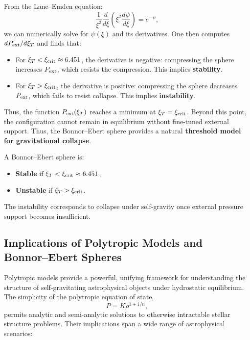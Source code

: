 From the Lane–Emden equation:
\[
\frac{1}{\xi^2} \frac{d}{d\xi}\left( \xi^2 \frac{d\psi}{d\xi} \right) = e^{-\psi},
\]
we can numerically solve for $\psi(\xi)$ and its derivatives. One then computes $dP_{\rm ext}/d\xi_T$ and finds that:

\begin{itemize}
    \item For $\xi_T < \xi_{\rm crit} \approx 6.451$, the derivative is negative: compressing the sphere increases $P_{\rm ext}$, which resists the compression. This implies \textbf{stability}.
    \item For $\xi_T > \xi_{\rm crit}$, the derivative is positive: compressing the sphere decreases $P_{\rm ext}$, which fails to resist collapse. This implies \textbf{instability}.
\end{itemize}

Thus, the function $P_{\rm ext}(\xi_T)$ reaches a minimum at $\xi_T = \xi_{\rm crit}$. Beyond this point, the configuration cannot remain in equilibrium without fine-tuned external support. Thus, the Bonnor–Ebert sphere provides a natural \textbf{threshold model for gravitational collapse}.

\begin{tcolorbox}[colback=red!5!white, colframe=red!75!black, title=Bonnor–Ebert Stability Criterion]
A Bonnor–Ebert sphere is:
\begin{itemize}
    \item \textbf{Stable} if $\xi_T < \xi_{\rm crit} \approx 6.451$,
    \item \textbf{Unstable} if $\xi_T > \xi_{\rm crit}$.
\end{itemize}
The instability corresponds to collapse under self-gravity once external pressure support becomes insufficient.
\end{tcolorbox}

\subsection{Implications of Polytropic Models and Bonnor–Ebert Spheres}

Polytropic models provide a powerful, unifying framework for understanding the structure of self-gravitating astrophysical objects under hydrostatic equilibrium. The simplicity of the polytropic equation of state,
\[
P = K \rho^{1 + 1/n},
\]
permits analytic and semi-analytic solutions to otherwise intractable stellar structure problems. Their implications span a wide range of astrophysical scenarios:

